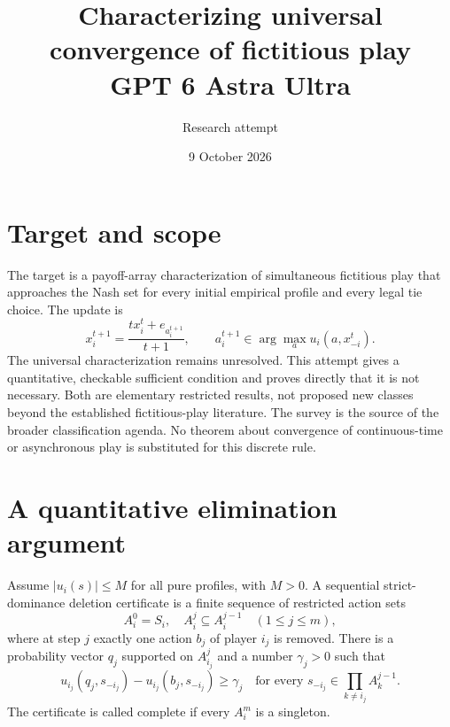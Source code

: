 \documentclass[11pt]{article}
\title{Characterizing universal convergence of fictitious play\\ GPT 6 Astra Ultra}
\author{Research attempt}
\date{9 October 2026}
\theoremstyle{definition}
\begin{document}
\maketitle

\section*{Target and scope}
The target is a payoff-array characterization of simultaneous fictitious play that approaches the Nash set for every initial empirical profile and every legal tie choice. The update is
\[
x_i^{t+1}=\frac{t x_i^t+e_{a_i^{t+1}}}{t+1},\qquad
 a_i^{t+1}\in\arg\max_a u_i(a,x_{-i}^t).
\]
The universal characterization remains unresolved. This attempt gives a quantitative, checkable sufficient condition and proves directly that it is not necessary. Both are elementary restricted results, not proposed new classes beyond the established fictitious-play literature. The survey \cite{survey} is the source of the broader classification agenda. No theorem about convergence of continuous-time or asynchronous play is substituted for this discrete rule.

\section*{A quantitative elimination argument}
Assume $|u_i(s)|\le M$ for all pure profiles, with $M>0$. A sequential strict-dominance deletion certificate is a finite sequence of restricted action sets
\[
 A^0_i=S_i,\quad A^j_i\subseteq A^{j-1}_i\quad(1\le j\le m),
\]
where at step $j$ exactly one action $b_j$ of player $i_j$ is removed. There is a probability vector $q_j$ supported on $A^j_{i_j}$ and a number $\gamma_j>0$ such that
\[
 u_{i_j}(q_j,s_{-i_j})-u_{i_j}(b_j,s_{-i_j})\ge\gamma_j
 \quad\text{for every }s_{-i_j}\in\prod_{k\ne i_j}A^{j-1}_k.
\]
The certificate is called complete if every $A_i^m$ is a singleton.
\end{document}
